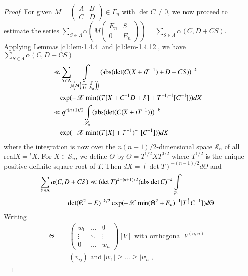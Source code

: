 \begin{proof}
For given $M=\left(\begin{smallmatrix} A & B\\ C & D
\end{smallmatrix}\right)\in\Gamma_{n}$ with $\det C\neq 0$, we now
proceed to estimate the series
$\sum\limits_{S\in\Lambda}\alpha\left(M\left(\begin{smallmatrix} E_{n}
  & S\\ 0 & E_{n}
\end{smallmatrix}\right)\right)=\sum\limits_{S\in
  \Lambda}\alpha(C,D+CS)$. Applying Lemmas \ref{c1:lem-1.4.4} and
\ref{c1:lem-1.4.12}, we have $\sum\limits_{S\in\Lambda}\alpha(C,D+CS)$
\begin{align*}
&\ll
  \sum_{S\in\Lambda}\int\limits_{\beta\left(M\left(\begin{smallmatrix}
      E_{n} & S\\ 0 & E_{n} \end{smallmatrix}\right)\right)} (\operatorname{abs}
  (\det
  (C(X+iT^{-1})+D+CS))^{-k}\\
&\quad\exp(-\mathscr{X}\min((T[X+C^{-1}D+S]+T^{-1,-1}[C^{-1}]))dX\\
&\ll q^{n(n+1)/2}\int\limits_{\mathscr{S}_{n}}(\operatorname{abs}(\det
  (C(X+iT^{-1})))^{-k}\\
&\quad\exp(-\mathscr{X}\min((T[X]+T^{-1})^{-1}[C^{-1}]))dX 
\end{align*}
where the integration is now over the $n(n+1)/2$-dimensional space
$\mathscr{S}_{n}$ of all real\pageoriginale $X={}^{t}X$. For
$X\in\mathscr{S}_{n}$, we define $\Theta$ by $\Theta=T^{1/2}XT^{1/2}$
where $T^{1/2}$ is the unique positive definite square root of
$T$. Then $dX=(\det T)^{-(n+1)/2}d\Theta$ and 
\begin{align*}
& \sum_{S\in\Lambda}\alpha(C,D+CS)\ll(\det T)^{k-(n+1)/2}(\operatorname{abs} \det
C)^{-k}\int\limits_{\varphi_{n}}\\
& \qquad \qquad \det
(\Theta^{2}+E)^{-k/2}\exp(-\mathscr{X}\min(\Theta^{2}+E_{n})^{-1}|T^{\frac{1}{2}}C^{-1}])d\Theta 
\end{align*}
Writing 
\begin{align*}
\Theta&=
\begin{pmatrix}
w_{1} &\ldots & 0\\
\vdots & \ddots & \vdots\\
0 & \ldots & w_{n}
\end{pmatrix}
[V]\text{ \ with orthogonal \ } V^{(n,n)}\\
&=(v_{ij})\text{ \  and \ }
|w_{1}|\geq\ldots\geq|w_{n}|, 
\end{align*}

\end{proof}
